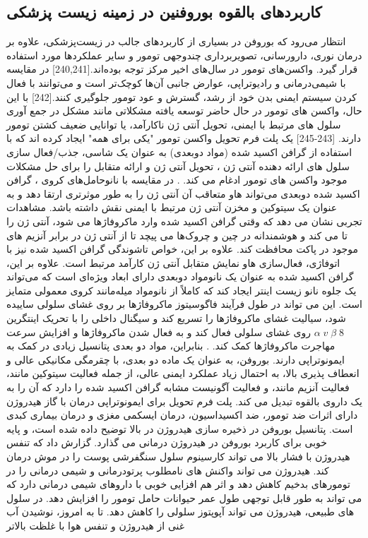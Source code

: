 \subsection{کاربردهای بالقوه بوروفنین در زمینه زیست پزشکی} انتظار می‌رود که بوروفن در بسیاری از کاربردهای جالب در زیست‌پزشکی، علاوه بر درمان نوری، دارورسانی، تصویربرداری چندوجهی تومور و سایر عملکردها مورد استفاده قرار گیرد. واکسن‌های تومور در سال‌های اخیر مرکز توجه بوده‌اند.\cite{rosenbergCancerImmunotherapyMoving2004, nestleVaccinationMelanomaPatients1998}[240,241] در مقایسه با شیمی‌درمانی و رادیوتراپی، عوارض جانبی آن‌ها کوچک‌تر است و می‌توانند با فعال کردن سیستم ایمنی بدن خود از رشد، گسترش و عود تومور جلوگیری کنند.\cite{hirschowitzImmunotherapyLungCancer2009}[242] با این حال، واکسن های تومور در حال حاضر توسعه یافته مشکلاتی مانند مشکل در جمع آوری سلول های مرتبط با ایمنی، تحویل آنتی ژن ناکارآمد، یا توانایی ضعیف کشتن تومور دارند. \cite{dunnCancerImmunoeditingImmunosurveillance2002, chenElementsCancerImmunity2017, gibneyPredictiveBiomarkersCheckpoint2016}[243-245]  یک پلت فرم تحویل واکسن تومور "یکی برای همه" ایجاد کرده اند که با استفاده از گرافن اکسید شده (مواد دوبعدی) به عنوان یک شاسی، جذب/فعال سازی سلول های ارائه دهنده آنتی ژن ، تحویل آنتی ژن و ارائه متقابل را برای حل مشکلات موجود واکسن های تومور ادغام می کند. . در مقایسه با نانوحامل‌های کروی ، گرافن اکسید شده دوبعدی می‌تواند  ‌هاو متعاقب آن آنتی ژن را به طور موثرتری ارتقا دهد و به عنوان یک سیتوکین و مخزن آنتی ژن مرتبط با ایمنی نقش داشته باشد. مشاهدات تجربی نشان می دهد که وقتی گرافن اکسید شده وارد ماکروفاژها می شود، آنتی ژن را تا می کند و هوشمندانه در چین و چروک‌ها می پیچد تا از آنتی ژن در برابر آنزیم های موجود در پاکت محافظت کند. علاوه بر این، خواص تاشوندگی گرافن اکسید شده نیز با اتوفاژی، فعال‌سازی  ‌هاو نمایش متقابل آنتی ژن کارآمد مرتبط است. علاوه بر این، گرافن اکسید شده به عنوان یک نانومواد دوبعدی دارای ابعاد ویژه‌ای است که می‌تواند یک جلوه نانو زیست اینتر ایجاد کند که کاملاً از نانومواد میله‌مانند کروی معمولی متمایز است. این می تواند در طول فرآیند فاگوسیتوز ماکروفاژها بر روی غشای سلولی ساییده شود، سیالیت غشای ماکروفاژها را تسریع کند و سیگنال داخلی را با تحریک اینتگرین $\alpha\; v\;\beta\;8$ روی غشای سلولی فعال کند و به فعال شدن ماکروفاژها و افزایش سرعت مهاجرت ماکروفاژها کمک کند. . بنابراین، مواد دو بعدی پتانسیل زیادی در کمک به ایمونوتراپی دارند. بوروفن، به عنوان یک ماده دو بعدی، با چقرمگی مکانیکی عالی و انعطاف پذیری بالا، به احتمال زیاد عملکرد ایمنی عالی، از جمله فعالیت سیتوکین مانند، فعالیت آنزیم مانند، و فعالیت آگونیست مشابه گرافن اکسید شده را دارد که آن را به یک داروی بالقوه تبدیل می کند. پلت فرم تحویل برای ایمونوتراپی درمان با گاز هیدروژن دارای اثرات ضد تومور، ضد اکسیداسیون، درمان ایسکمی مغزی و درمان بیماری کبدی است. پتانسیل بوروفن در ذخیره سازی هیدروژن در بالا توضیح داده شده است، و پایه خوبی برای کاربرد بوروفن در هیدروژن درمانی می گذارد. گزارش داد که تنفس هیدروژن با فشار بالا می تواند کارسینوم سلول سنگفرشی پوست را در موش درمان کند. هیدروژن می تواند واکنش های نامطلوب پرتودرمانی و شیمی درمانی را در تومورهای بدخیم کاهش دهد و اثر هم افزایی خوبی با داروهای شیمی درمانی دارد که می تواند به طور قابل توجهی طول عمر حیوانات حامل تومور را افزایش دهد. در سلول های طبیعی، هیدروژن می تواند آپوپتوز سلولی را کاهش دهد. تا به امروز، نوشیدن آب غنی از هیدروژن و تنفس هوا با غلظت بالاتر 